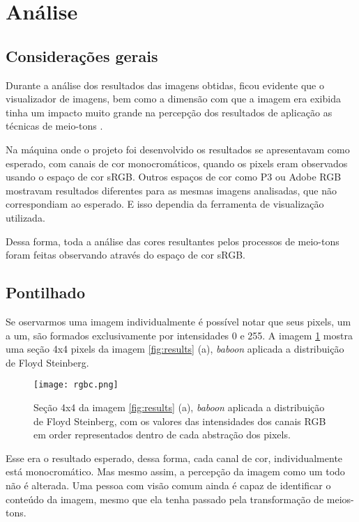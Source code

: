 \documentclass[conference]{IEEEtran}
\begin{document}
 \section{Análise}
 \subsection{Considerações gerais}
 Durante a análise dos resultados das imagens obtidas, ficou evidente que o visualizador de imagens, bem como a dimensão com que a imagem era exibida tinha um impacto muito grande na percepção dos resultados de aplicação as técnicas de meio-tons \cite{srgb}.

 Na máquina onde o projeto foi desenvolvido os resultados se apresentavam como esperado, com canais de cor monocromáticos, quando os pixels eram observados usando o espaço de cor sRGB. Outros espaços de cor como P3 ou Adobe RGB mostravam resultados diferentes para as mesmas imagens analisadas, que não correspondiam ao esperado. E isso dependia da ferramenta de visualização utilizada.

 Dessa forma, toda a análise das cores resultantes pelos processos de meio-tons foram feitas observando através do espaço de cor sRGB.

 \subsection{Pontilhado}

 Se oservarmos uma imagem individualmente é possível notar que seus pixels, um a um, são formados exclusivamente por intensidades 0 e 255. A imagem \ref{fig:rgbc} mostra uma seção 4x4 pixels da imagem \ref{fig:results} (a), \textit{baboon} aplicada a distribuição de Floyd Steinberg.

 \begin{figure}[ht]
     \centering
     \texttt{[image: rgbc.png]}
     \caption{Seção 4x4 da imagem \ref{fig:results} (a), \textit{baboon} aplicada a distribuição de Floyd Steinberg, com os valores das intensidades dos canais RGB em order representados dentro de cada abstração dos pixels.}
     \label{fig:rgbc}
 \end{figure}

 Esse era o resultado esperado, dessa forma, cada canal de cor, individualmente está monocromático. Mas mesmo assim, a percepção da imagem como um todo não é alterada. Uma pessoa com visão comum ainda é capaz de identificar o conteúdo da imagem, mesmo que ela tenha passado pela transformação de meios-tons.
\end{document}
